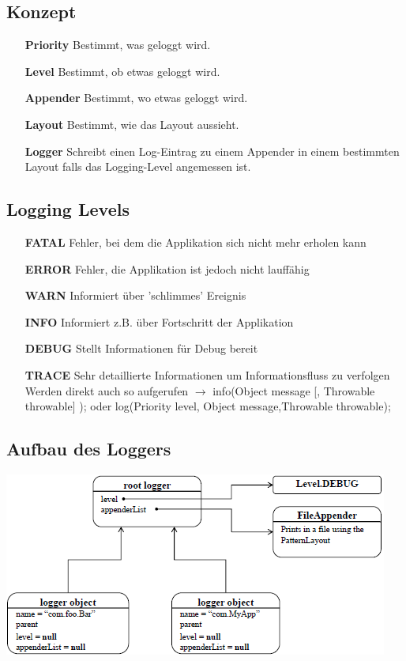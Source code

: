 \documentclass[a4paper,10pt]{article}
\newcommand{\Bold}[1]{\textbf{#1}} %
\begin{document}
\subsection{Konzept}
\begin{itemize}
	\item[\Bold {Priority}] Bestimmt, was geloggt wird.
	\item[\Bold {Level}] Bestimmt, ob etwas geloggt wird.
	\item[\Bold {Appender}] Bestimmt, wo etwas geloggt wird.
	\item[\Bold {Layout}] Bestimmt, wie das Layout aussieht.
	\item[\Bold {Logger}] Schreibt einen Log-Eintrag zu einem Appender in einem bestimmten Layout falls das Logging-Level angemessen ist.
\end{itemize}

\subsection{Logging Levels}
\begin{itemize}
	\item[\Bold {FATAL}] Fehler, bei dem die Applikation sich nicht mehr erholen kann
	\item[\Bold {ERROR}] Fehler, die Applikation ist jedoch nicht lauffähig
	\item[\Bold {WARN}] Informiert über 'schlimmes' Ereignis
	\item[\Bold {INFO}] Informiert z.B. über Fortschritt der Applikation
	\item[\Bold {DEBUG}] Stellt Informationen für Debug bereit 
	\item[\Bold {TRACE}] Sehr detaillierte Informationen um Informationsfluss zu verfolgen
Werden direkt auch so aufgerufen $\to$ info(Object message [, Throwable throwable] ); oder log(Priority level, Object message,Throwable throwable);
\end{itemize}

\subsection{Aufbau des Loggers}
\includegraphics[scale=1]{log4j.png}
\end{document}
